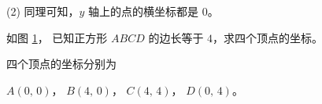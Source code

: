 (2) 同理可知，$y$ 轴上的点的横坐标都是 $0$。

\begin{figure}[htbp]
  \centering
  \begin{minipage}{6cm}
  \centering
  
  \caption{}\label{fig:14-5}
  \end{minipage}
  \qquad
  \begin{minipage}{8cm}
  \centering
  
  \caption{}\label{fig:14-6}
  \end{minipage}
\end{figure}

\liti 如图 \ref{fig:14-6}， 已知正方形 $ABCD$ 的边长等于 $4$，求四个顶点的坐标。

\jie 四个顶点的坐标分别为

\hspace*{1.5em} $A(0,\, 0)$， $B(4,\, 0)$， $C(4,\, 4)$， $D(0,\, 4)$。


\lianxi
\begin{xiaotis}





\end{xiaotis}

